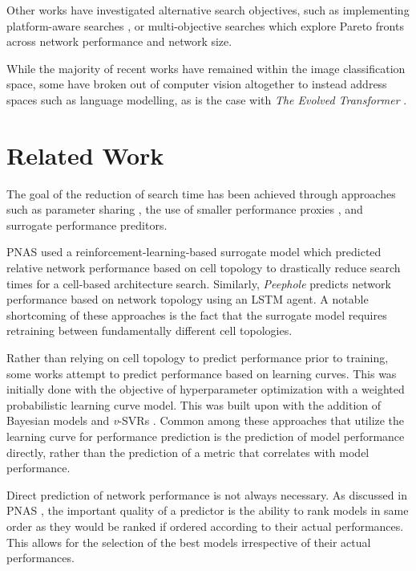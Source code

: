 \documentclass[twocolumn]{article}
\begin{document}
Other works have investigated alternative search objectives, such as implementing platform-aware searches \cite{mnas} \cite{hardware_darts}, 
or multi-objective searches \cite{lemonade} which explore Pareto fronts across network performance and network size.

While the majority of recent works have remained within the image classification space, some have broken out of computer vision
altogether to instead address spaces such as language modelling, as is the case with \emph{The Evolved Transformer} \cite{evolved_transformer}.

\section{Related Work}

The goal of the reduction of search time has been achieved through approaches such as parameter sharing \cite{enas} \cite{cars},
the use of smaller performance proxies \cite{econas}, and surrogate performance preditors.

PNAS\cite{pnas} used a reinforcement-learning-based surrogate model which predicted relative network performance based on cell topology to drastically
reduce search times for a cell-based architecture search. 
Similarly, \emph{Peephole} \cite{peephole} predicts network performance based on network topology using an LSTM agent.
A notable shortcoming of these approaches is the fact that the surrogate model requires retraining between fundamentally different cell topologies.

Rather than relying on cell topology to predict performance prior to training, some works attempt to predict performance based on learning curves\cite{bayesian_pred}\cite{vsvr_pred}.
This was initially done with the objective of hyperparameter optimization with a weighted probabilistic learning curve model\cite{hparam_opt_1}.
This was built upon with the addition of Bayesian models \cite{bayesian_pred} and \emph{v}-SVRs \cite{vsvr_pred}.
Common among these approaches that utilize the learning curve for performance prediction is the prediction of model performance directly,
rather than the prediction of a metric that correlates with model performance.

Direct prediction of network performance is not always necessary. 
As discussed in PNAS \cite{pnas}, the important quality of a predictor is the ability to rank models in same order as they would be ranked if ordered
according to their actual performances.
This allows for the selection of the best models irrespective of their actual performances.
\end{document}
